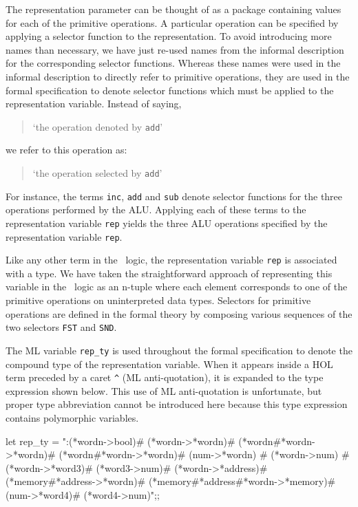 The representation parameter can be thought of as a package containing
values for each of the primitive operations.
A particular operation can be specified by applying a selector function
to the representation.
To avoid introducing more names than necessary,
we have just re-used names from the informal description
for the corresponding selector functions.
Whereas these names were used in the informal description to
directly refer to primitive operations,
they are used in the formal specification to
denote selector functions which must be applied
to the representation variable.
Instead of saying,

\begin{quote}
`the operation denoted by \verb"add"'
\end{quote}

\noindent
we refer to this operation as:

\begin{quote}
`the operation selected by \verb"add"'
\end{quote}

For instance, the terms \verb"inc", \verb"add" and \verb"sub" denote
selector functions for the three operations performed by the ALU.
Applying each of these terms to the representation variable \verb"rep"
yields the three ALU operations specified by the representation
variable \verb"rep".

Like any other term in the \HOL\ logic, the representation variable \verb"rep"
is associated with a type.
We have taken the straightforward approach of representing this variable
in the \HOL\ logic as an \mbox{n-tuple} where each element corresponds
to one of the primitive operations on uninterpreted data types.
Selectors for primitive operations are defined in the formal theory
by composing various sequences of the two selectors \verb"FST" and
\verb"SND".

The ML variable \verb"rep_ty"
is used throughout the formal specification to
denote the compound type of the representation variable.
When it appears
inside a HOL term preceded by a caret \verb"^"
(ML anti-quotation),
it is expanded to the type expression shown below.
This use of ML anti-quotation is unfortunate, but
proper type abbreviation cannot be introduced here because
this type expression contains polymorphic variables.

\begintt
let rep_ty =
  ":(*wordn->bool)#                       %
    (*wordn->*wordn)#                     %
    (*wordn#*wordn->*wordn)#              %
    (*wordn#*wordn->*wordn)#              %
    (num->*wordn) #                       %
    (*wordn->num) #                       %
    (*wordn->*word3)#                     %
    (*word3->num)#                        %
    (*wordn->*address)#                   %
    (*memory#*address->*wordn)#           %
    (*memory#*address#*wordn->*memory)#   %
    (num->*word4)#                        %
    (*word4->num)";;                      %
\endtt

